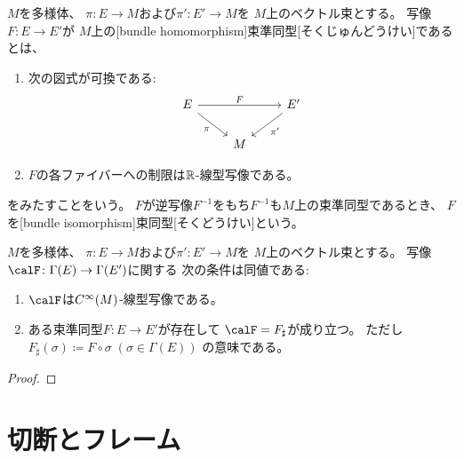 \documentclass[report]{jlreq}
\begin{document}
\begin{definition}[束準同型]
    $M$を多様体、
    $\pi \colon E \to M$および$\pi' \colon E' \to M$を
    $M$上のベクトル束とする。
    {\smooth}写像$F \colon E \to E'$が
    $M$上の[bundle homomorphism]{束準同型}[そくじゅんどうけい]であるとは、
    \begin{enumerate}
        \item 次の図式が可換である:
            \begin{equation}
                \begin{tikzcd}
                    E \ar{rr}{F} \ar{rd}[swap]{\pi} && E' \ar{ld}{\pi'} \\
                    & M
                \end{tikzcd}
            \end{equation}
        \item $F$の各ファイバーへの制限は$\mathbb{R}$-線型写像である。
    \end{enumerate}
    をみたすことをいう。
    $F$が逆写像$F^{-1}$をもち$F^{-1}$も$M$上の束準同型であるとき、
    $F$を[bundle isomorphism]{束同型}[そくどうけい]という。
\end{definition}

\begin{theorem}[束準同型の特徴付け]
    $M$を多様体、
    $\pi \colon E \to M$および$\pi' \colon E' \to M$を
    $M$上のベクトル束とする。
    写像$\calF \colon \Gamma(E) \to \Gamma(E')$に関する
    次の条件は同値である:
    \begin{enumerate}
        \item $\calF$は$C^\infty(M)$-線型写像である。
        \item ある束準同型$F \colon E \to E'$が存在して
            $\calF = F_\sharp$が成り立つ。
            ただし$F_\sharp(\sigma) \coloneqq F \circ \sigma \; (\sigma \in \Gamma(E))$
            の意味である。
    \end{enumerate}
\end{theorem}

\begin{proof}
    \TODO{}
\end{proof}

%
\section{切断とフレーム}
\end{document}
